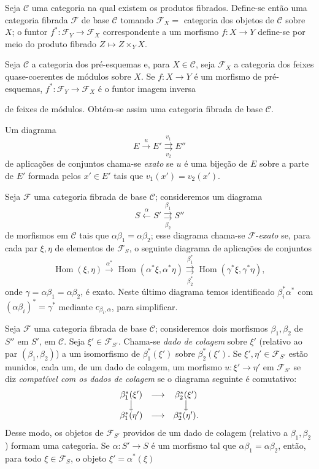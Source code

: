  Seja $\mathcal C$ uma categoria na qual existem os
produtos fibrados. Define-se então uma categoria fibrada $\mathcal F$ de
base $\mathcal C$ tomando $\mathcal F_X=$ categoria dos objetos de
$\mathcal C$ sobre $X$; o funtor
$f^*:\mathcal F_Y\longrightarrow\mathcal F_X$ correspondente a um morfismo
$f:X\longrightarrow Y$ define-se por meio do produto fibrado
$Z\longmapsto Z\times_YX$.

 Seja $\mathcal C$ a categoria dos pré-esquemas e, para
$X\in\mathcal C$, seja $\mathcal F_X$ a categoria dos feixes
quase-coerentes de módulos sobre $X$. Se $f:X\longrightarrow Y$ é um morfismo
de pré-esquemas, $f^*:\mathcal F_Y\longrightarrow\mathcal F_X$ é o funtor
imagem inversa

de feixes de módulos. Obtém-se assim uma categoria fibrada de base
$\mathcal C$.

 Um diagrama
\[
  E\xrightarrow{u}E'
  \overset{v_1}{\underset{v_2}{\rightrightarrows}}E''
\]
de aplicações de conjuntos chama-se \emph{exato} se $u$ é uma bijeção de
$E$ sobre a parte de $E'$ formada pelos $x'\in E'$ tais que
$v_1(x')=v_2(x')$.

 Seja $\mathcal F$ uma categoria fibrada de base
$\mathcal C$; consideremos um diagrama
\[
  \tag{+}
  S\xleftarrow{\alpha}S'
  \overset{\beta_1}{\underset{\beta_2}{\rightrightarrows}}S''
\]
de morfismos em $\mathcal C$ tais que
$\alpha\beta_1=\alpha\beta_2$; esse diagrama chama-se
$\mathcal F$-\emph{exato} se, para cada par $\xi,\eta$ de elementos de
$\mathcal F_S$, o seguinte diagrama de aplicações de conjuntos
\[
  \tag{+'}
  \operatorname{Hom}(\xi,\eta)
  \xrightarrow{\alpha^*}
  \operatorname{Hom}(\alpha^*\xi,\alpha^*\eta)
  \overset{\beta_1^*}{\underset{\beta_2^*}{\rightrightarrows}}
  \operatorname{Hom}(\gamma^*\xi,\gamma^*\eta),
\]
onde $\gamma=\alpha\beta_1=\alpha\beta_2$, é exato. Neste último diagrama
temos identificado $\beta_i^*\alpha^*$ com
$(\alpha\beta_i)^*=\gamma^*$ mediante $c_{\beta_i,\alpha}$, para simplificar.

 Seja $\mathcal F$ uma categoria fibrada de base
$\mathcal C$; consideremos dois morfismos $\beta_1,\beta_2$ de $S''$ em $S'$,
em $\mathcal C$. Seja
$\xi'\in\mathcal F_{S'}$. Chama-se \emph{dado de colagem} sobre $\xi'$
(relativo ao par $(\beta_1,\beta_2)$) a um isomorfismo de
$\beta_1^*(\xi')$ sobre $\beta_2^*(\xi')$. Se $\xi',\eta'\in\mathcal F_{S'}$
estão munidos, cada um, de um dado de colagem, um morfismo
$u:\xi'\longrightarrow\eta'$ em $\mathcal F_{S'}$ se diz
\emph{compatível com os dados de colagem} se o diagrama seguinte é
comutativo:
\[
\begin{array}{ccc}
  \beta_1^*(\xi') & \longrightarrow & \beta_2^*(\xi') \\
  \big\downarrow && \big\downarrow \\
  \beta_1^*(\eta') & \longrightarrow & \beta_2^*(\eta').
\end{array}
\]
Desse modo, os objetos de $\mathcal F_{S'}$ providos de um dado de colagem
(relativo a $\beta_1,\beta_2$) formam uma categoria. Se
$\alpha:S'\longrightarrow S$ é um morfismo tal que
$\alpha\beta_1=\alpha\beta_2$, então, para todo $\xi\in\mathcal F_S$, o
objeto $\xi'=\alpha^*(\xi)$

